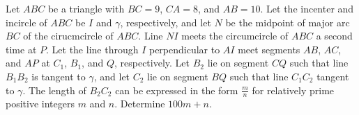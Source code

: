 Let $ABC$ be a triangle with $BC=9$, $CA=8$, and $AB=10$. Let the incenter and incircle of $ABC$ be $I$ and $\gamma$, respectively, and let $N$ be the midpoint of major arc $BC$ of the cirucmcircle of $ABC$. Line $NI$ meets the circumcircle of $ABC$ a second time at $P$. Let the line through $I$ perpendicular to $AI$ meet segments $AB$, $AC$, and $AP$ at $C_1$, $B_1$, and $Q$, respectively. Let $B_2$ lie on segment $CQ$ such that line $B_1B_2$ is tangent to $\gamma$, and let $C_2$ lie on segment $BQ$ such that line $C_1C_2$ tangent to $\gamma$. The length of $B_2C_2$ can be expressed in the form $\frac{m}{n}$ for relatively prime positive integers $m$ and $n$. Determine $100m+n$.
